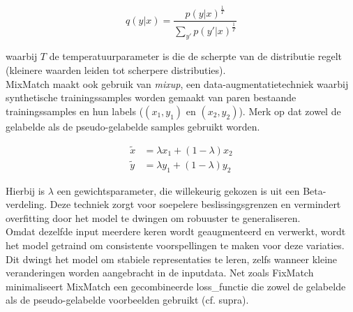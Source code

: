 $$
q(y|x) = \frac{p(y|x)^{\frac{1}{T}}}{\sum_{y'} p(y'|x)^\frac{1}{T}}
$$

waarbij $T$ de temperatuurparameter is die de scherpte van de distributie regelt (kleinere waarden leiden tot scherpere distributies). \\

MixMatch maakt ook gebruik van \emph{mixup}, een data-augmentatietechniek waarbij synthetische trainingssamples worden gemaakt van paren bestaande trainingssamples en hun labels ($(x_1, y_1)$ en $(x_2, y_2)$). Merk op dat zowel de gelabelde als de pseudo-gelabelde samples gebruikt worden. 

\begin{align*}
    \tilde{x} & = \lambda x_1 + (1 - \lambda) x_2 \\
    \tilde{y} & = \lambda y_1 + (1 - \lambda) y_2
\end{align*}

Hierbij is $\lambda$ een gewichtsparameter, die willekeurig gekozen is uit een Beta-verdeling. Deze techniek zorgt voor soepelere beslissingsgrenzen en vermindert overfitting door het model te dwingen om robuuster te generaliseren. \autocite{Zhang_2017} \\

Omdat dezelfde input meerdere keren wordt geaugmenteerd en verwerkt, wordt het model getraind om consistente voorspellingen te maken voor deze variaties. Dit dwingt het model om stabiele representaties te leren, zelfs wanneer kleine veranderingen worden aangebracht in de inputdata. Net zoals FixMatch minimaliseert MixMatch een gecombineerde \gls{loss_functie} die zowel de gelabelde als de pseudo-gelabelde voorbeelden gebruikt (cf. supra). \autocite{Berthelot_2019}